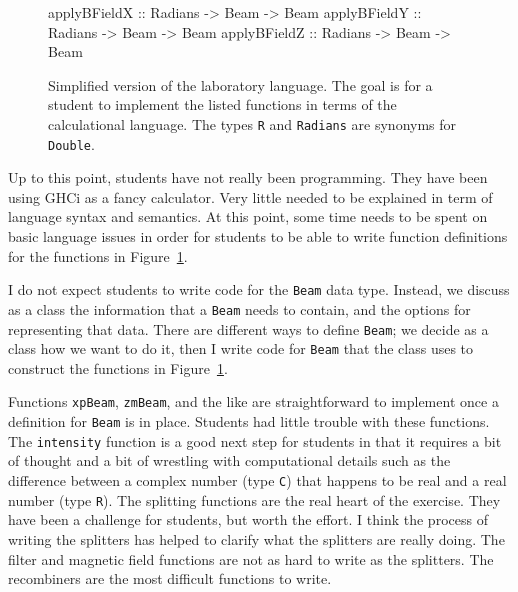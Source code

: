 \documentclass{eptcs}
\newcommand{\DataTypeTok}[1]{\textcolor[rgb]{0.56,0.13,0.00}{{#1}}}
\newcommand{\SpecialCharTok}[1]{\textcolor[rgb]{0.25,0.44,0.63}{{#1}}}
\newcommand{\FunctionTok}[1]{\textcolor[rgb]{0.02,0.16,0.49}{{#1}}}
\begin{document}
\begin{figure}
\begin{Highlighting}[]
\FunctionTok{applyBFieldX} \SpecialCharTok{::} \DataTypeTok{Radians} \SpecialCharTok{->} \DataTypeTok{Beam} \SpecialCharTok{->} \DataTypeTok{Beam}
\FunctionTok{applyBFieldY} \SpecialCharTok{::} \DataTypeTok{Radians} \SpecialCharTok{->} \DataTypeTok{Beam} \SpecialCharTok{->} \DataTypeTok{Beam}
\FunctionTok{applyBFieldZ} \SpecialCharTok{::} \DataTypeTok{Radians} \SpecialCharTok{->} \DataTypeTok{Beam} \SpecialCharTok{->} \DataTypeTok{Beam}
\end{Highlighting}
\caption{Simplified version of the laboratory language.
  The goal is for a student to implement
  the listed functions in terms of the calculational language.
  The types \DataTypeTok{\texttt{R}} and \DataTypeTok{\texttt{Radians}}
  are synonyms for \DataTypeTok{\texttt{Double}}.
}
\label{simplelablang}
\end{figure}

Up to this point, students have not really been programming.
They have been using GHCi as a fancy calculator.
Very little needed to be explained in term of language
syntax and semantics.
At this point, some time needs to be spent on basic language
issues in order for students to be able to write function
definitions for the functions in Figure~\ref{simplelablang}.

I do not expect students to write code for the \DataTypeTok{\texttt{Beam}}
data type.  Instead, we discuss as a class the information that a
\DataTypeTok{\texttt{Beam}} needs to contain, and the options
for representing that data.  There are different ways to define
\DataTypeTok{\texttt{Beam}}; we decide as a class how we want to do it,
then I write code for \DataTypeTok{\texttt{Beam}} that the class uses
to construct the functions in Figure~\ref{simplelablang}.

Functions \FunctionTok{\texttt{xpBeam}}, \FunctionTok{\texttt{zmBeam}},
and the like are straightforward to implement once a definition
for \DataTypeTok{\texttt{Beam}} is in place.  Students had little trouble
with these functions.  The \FunctionTok{\texttt{intensity}} function
is a good next step for students in that it requires a bit of thought
and a bit of wrestling with computational details such as the difference
between a complex number (type \DataTypeTok{\texttt{C}}) that happens
to be real and a real number (type \DataTypeTok{\texttt{R}}).
The splitting functions are the real heart of the exercise.
They have been a challenge for students, but worth the effort.
I think the process of writing the splitters has helped to clarify
what the splitters are really doing.
The filter and magnetic field functions are not as hard to write
as the splitters.  The recombiners are the most difficult functions
to write.
\end{document}

